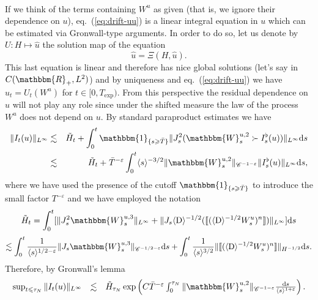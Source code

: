 \documentclass[11pt]{article}
\newcommand{\mathD}{\mathrm{D}}
\newcommand{\mathd}{\mathrm{d}}
\newcommand{\VV}{\mathscr{C}}
\begin{document}
\

If we think of the terms containing $W^u$ as given (that is, we ignore their
dependence on $u$), eq.~(\ref{eq:drift-uu}) is a linear integral equation in
$u$ which can be estimated via Gronwall-type arguments. In order to do so, let
us denote by $U : H \mapsto \hat{u}$ the solution map of the equation
\begin{equation}
  \hat{u} = \Xi (H, \hat{u}) . \label{eq:map-U}
\end{equation}
This last equation is linear and therefore has nice global solutions (let's
say in $C (\mathbbm{R}_+, L^2)$) and by uniqueness and eq.~(\ref{eq:drift-uu})
we have $u_t = U_t (W^u)$ for $t \in [0, T_{\exp})$. From this perspective the
residual dependence on $u$ will not play any role since under the shifted
measure the law of the process $W^u$ does not depend on $u$. By standard
paraproduct estimates we have
\begin{eqnarray*}
  \| I_t (u) \|_{L^{\infty}} & \lesssim & \tilde{H}_t + \int^t_0
  \mathbbm{1}_{\{ s \geqslant \bar{T} \}} \| J^2_s (\mathbbm{W}_s^{u, 2} \succ
  I_s^{\flat} (u)) \|_{L^{\infty}} \mathd s\\
  & \lesssim & \tilde{H}_t +_{} \bar{T}^{- \varepsilon} \int^t_0 \langle s
  \rangle^{- 3 / 2} \| \mathbbm{W}_s^{u, 2} \|_{\VV^{- 1 - \varepsilon}} \|
  I_s^{\flat} (u) \|_{L^{\infty}} \mathd s,
\end{eqnarray*}
where we have used the presence of the cutoff $\mathbbm{1}_{\{ s \geqslant
\bar{T} \}}$ to introduce the small factor $T^{- \varepsilon}$ and we have
employed the notation
\[ \tilde{H}_t = \int^t_0 [\|J^2_s \mathbbm{W}^{u, 3}_s \|_{L^{\infty}} +
   \| J_s \langle \mathD \rangle^{- 1 / 2} (\llbracket (\langle \mathD
   \rangle^{- 1 / 2} W^u_s)^n \rrbracket) \|_{L^{\infty}}] \mathd s \]
\[ \lesssim \int^t_0 \frac{1}{\langle s \rangle^{1 / 2 - \varepsilon}} \|J_s
   \mathbbm{W}^{u, 3}_s \|_{\VV^{- 1 / 2 - \varepsilon}} \mathd s +
   \int^t_0 \frac{1}{\langle s \rangle^{3 / 2}} \| \llbracket (\langle \mathD
   \rangle^{- 1 / 2} W^u_s)^n \rrbracket \|_{H^{- 1 / 2}} \mathd s. \]
Therefore, by Gronwall's lemma
\begin{equation}
  \begin{array}{lll}
    \sup_{t \leqslant \tau_N} \| I_t (u) \|_{L^{\infty}} & \lesssim &
    \tilde{H}_{\tau_N} \exp \left( C \bar{T}^{- \varepsilon} \int^{\tau_N}_0
    \|\mathbbm{W}_s^{u, 2} \|_{\VV^{- 1 - \varepsilon}} \frac{\mathd
    s}{\langle s \rangle^{1 + \varepsilon}} \right) .
  \end{array} \label{boundIu}
\end{equation}
\end{document}
